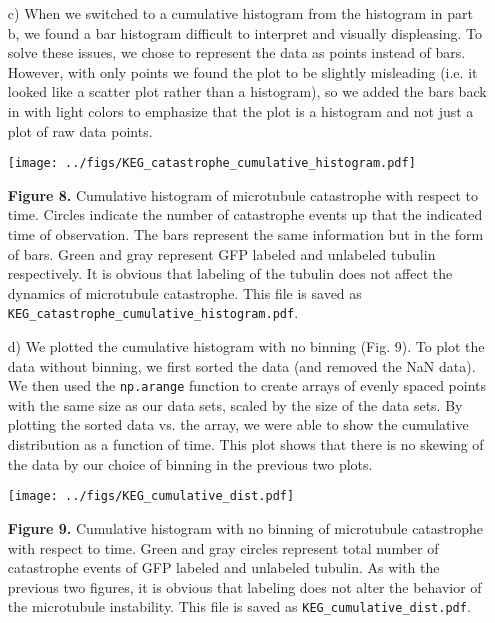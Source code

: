 \begin{itemize}
	\item[c)] When we switched to a cumulative histogram from the histogram in part b, we
found a bar histogram difficult to interpret and visually displeasing. To solve these issues, we chose to
represent the data as points instead of bars. However, with only points we
found the plot to be slightly misleading (i.e. it looked like a scatter plot
rather than a histogram), so we added the bars back in with light colors to
emphasize that the plot is a histogram and not just a plot of raw data
points.

\begin{center}
	\texttt{[image: ../figs/KEG\_catastrophe\_cumulative\_histogram.pdf]}
\end{center}
	{\small \textbf{Figure 8.} Cumulative histogram of microtubule
	catastrophe with respect to time. Circles indicate the number of
	catastrophe events up that the indicated time of observation. The bars
	represent the same information but in the form of bars. Green and gray
	represent GFP labeled and unlabeled tubulin respectively. It is
	obvious that labeling of the tubulin does not affect the dynamics of
microtubule catastrophe. This file is saved as
\texttt{KEG\_catastrophe\_cumulative\_histogram.pdf}.}

\newpage
	\item[d)] We plotted the cumulative histogram with no binning (Fig.
		9). To plot the data without binning, we first sorted the data
		(and removed the NaN data). We then used the
		\texttt{np.arange} function to create arrays of evenly spaced
		points with the same size as our data sets, scaled by the size
		of the data sets. By plotting the sorted data vs. the array,
		we were able to show the cumulative distribution as a function
		of time. This plot shows that there is no skewing of the data
		by our choice of binning in the previous two plots. 

		\begin{center}
			\texttt{[image: ../figs/KEG\_cumulative\_dist.pdf]}
		\end{center}
			{\small \textbf{Figure 9.} Cumulative histogram with
			no binning of
			microtubule catastrophe with respect to time. Green
			and gray circles represent total number of catastrophe
			events of GFP labeled and unlabeled tubulin. As with
			the previous two figures, it is obvious that labeling
		does not alter the behavior of the microtubule instability.
		This file is saved as \texttt{KEG\_cumulative\_dist.pdf}.}


 
\end{itemize}






